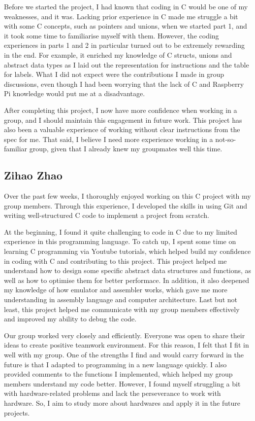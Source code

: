 \documentclass[9pt,a4paper]{article}
\begin{document}
Before we started the project, I had known that coding in C would be one of my weaknesses, and it was.
Lacking prior experience in C made me struggle a bit with some C concepts, such as pointers and unions, when we started part 1, and it took some time to familiarise myself with them.
However, the coding experiences in parts 1 and 2 in particular turned out to be extremely rewarding in the end.
For example, it enriched my knowledge of C structs, unions and abstract data types as I laid out the representation for instructions and the table for labels.
What I did not expect were the contributions I made in group discussions, even though I had been worrying that the lack of C and Raspberry Pi knowledge would put me at a disadvantage. \

After completing this project, I now have more confidence when working in a group, and I should maintain this engagement in future work.
This project has also been a valuable experience of working without clear instructions from the spec for me.
That said, I believe I need more experience working in a not-so-familiar group, given that I already knew my groupmates well this time.

\subsection{Zihao Zhao}

Over the past few weeks, I thoroughly enjoyed working on this C project with my group members.
Through this experience, I developed the skills in using Git and writing well-structured C code to implement a project from scratch.

At the beginning, I found it quite challenging to code in C due to my limited experience in this programming language.
To catch up, I spent some time on learning C programming via Youtube tutorials, which helped build my confidence in coding with C and contributing to this project.
This project helped me understand how to design some specific abstract data structures and functions, as well as how to optimise them for better performace.
In addition, it also deepened my knowledge of how emulator and assembler works, which gave me more understanding in assembly language and computer architecture.
Last but not least, this project helped me communicate with my group members effectively and improved my ability to debug the code.

Our group worked very closely and efficiently. Everyone was open to share their ideas to create positive teamwork environment.
For this reason, I felt that I fit in well with my group. One of the strengths I find and would carry forward in the future is that I adapted to programming in a new language quickly.
I also provided comments to the functions I implemented, which helped my group members understand my code better.
However, I found myself struggling a bit with hardware-related problems and lack the perseverance to work with hardware. So, I aim to study more about hardwares and apply it in the future projects.
\end{document}
